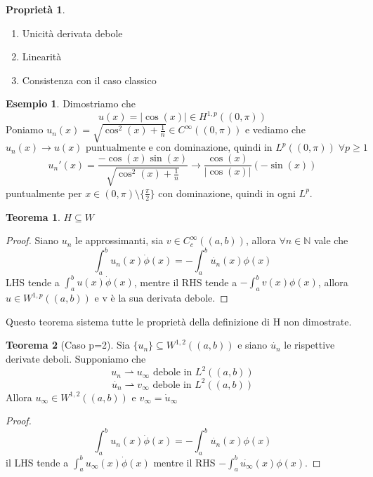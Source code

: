 \documentclass[a4paper]{book}
\theoremstyle{definition}
\newtheorem{ex}{Esempio}
\theoremstyle{remark}
\theoremstyle{definition}
\newtheorem{teo}{Teorema}
\newtheorem{prop}{Proprietà}
\newcommand{\bbn}{\mathbb{N}}
\begin{document}
\begin{prop}
	\begin{enumerate}
		\item Unicità derivata debole
		\item Linearità
		\item Consistenza con il caso classico
	\end{enumerate}
\end{prop}

\begin{ex}
	Dimostriamo che $$u(x) = |\cos(x)| \in H^{1,p}((0, \pi))$$ Poniamo $u_n(x) = \sqrt{\cos^2(x) + \frac1n} \in C^\infty((0, \pi))$ e vediamo che 
	$$u_n (x)\to u(x) \text{ puntualmente e con dominazione, quindi in } L^p((0, \pi)) \; \forall p \ge 1$$
	$$u_n'(x) = \frac{-\cos(x)\sin(x)}{\sqrt{\cos^2(x) + \frac1n}} \to \frac{\cos(x)}{|\cos(x)|} (-\sin(x))$$
	puntualmente per $x \in (0, \pi) \setminus \{\frac\pi2\}$ con dominazione, quindi in ogni $L^p$.
\end{ex}

\begin{teo}
	$H \subseteq W$
\end{teo}

\begin{proof}
	Siano $u_n$ le approssimanti, sia $v \in C^\infty_c((a,b))$, allora $\forall n \in \bbn$ vale che 
	$$\int_a^b u_n(x)\dot{\phi}(x) = -\int_a^b \dot{u_n}(x) \phi(x) $$
	LHS tende a $\int_a^b u(x) \dot{\phi}(x)$, mentre il RHS tende a $-\int_a^b v(x) \phi(x)$, allora $u \in W^{1, p}((a,b))$ e v è la sua derivata debole.
\end{proof}

Questo teorema sistema tutte le proprietà della definizione di H non dimostrate.

\begin{teo}[Caso p=2]
	Sia $\{u_n\}\subseteq W^{1, 2}((a,b))$ e siano $\dot{u_n}$ le rispettive derivate deboli. Supponiamo che 
	$$u_n \rightharpoonup u_\infty \text{ debole in } L^2((a,b))$$
	$$\dot{u_n} \rightharpoonup v_\infty \text{ debole in } L^2((a,b))$$
	Allora $u_\infty \in W^{1,2}((a,b))$ e $v_\infty = \dot{u}_\infty$
\end{teo}

\begin{proof}
	$$\int_a^b u_n(x) \dot{\phi}(x) = -\int_a^b \dot{u_n}(x) \phi(x) $$
	il LHS tende a $\int_a^b u_\infty(x) \dot{\phi}(x)$ mentre il RHS $ -\int_a^b \dot{u_\infty}(x) \phi(x) $.
\end{proof}
\end{document}
